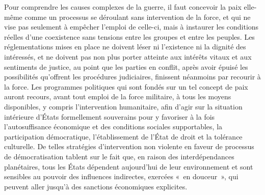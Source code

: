 
{Pour comprendre les causes complexes de la guerre, il faut concevoir
la paix elle-même comme un processus se déroulant sans intervention
de la force, et qui ne vise pas seulement à empêcher l'emploi de
celle-ci, mais à instaurer les conditions réelles d'une coexistence
sans tensions entre les groupes et entre les peuples. Les
réglementations mises en place ne doivent léser ni l'existence ni la
dignité des intéressés, et ne doivent pas non plus porter atteinte
aux intérêts vitaux et aux sentiments de justice, au point que les
parties en conflit, après avoir épuisé les possibilités qu'offrent
les procédures judiciaires, finissent néanmoins par recourir à la
force. Les programmes politiques qui sont fondés sur un tel concept
de paix auront recours, avant tout emploi de la force militaire, à
tous les moyens disponibles, y compris l'intervention humanitaire,
afin d'agir sur la situation intérieure d'États formellement
souverains pour y favoriser à la fois l'autosuffisance économique et
des conditions sociales supportables, la participation démocratique,
l'établissement de l'État de droit et la tolérance culturelle. De
telles stratégies d'intervention non violente en faveur de processus
de démocratisation tablent sur le fait que, en raison des
interdépendances planétaires, tous les États dépendent aujourd'hui de
leur environnement et sont sensibles au pouvoir des influences
indirectes, exercées «~en douceur~», qui peuvent aller jusqu'à des
sanctions économiques explicites.
}



